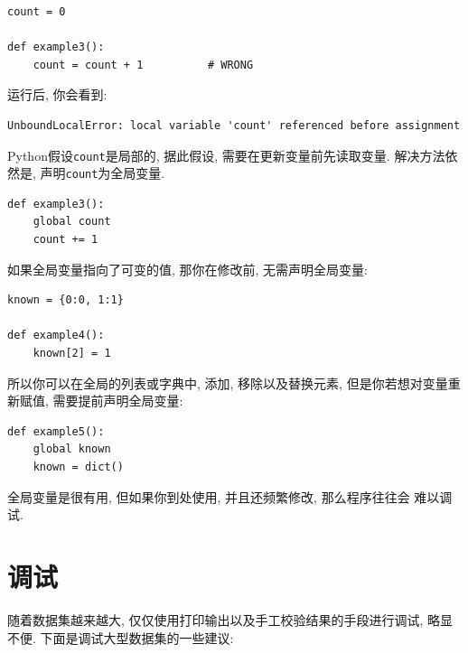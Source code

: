 \documentclass[10pt]{book}
\begin{document}
\begin{verbatim}
count = 0

def example3():
    count = count + 1          # WRONG
\end{verbatim}
%
运行后, 你会看到:

\begin{verbatim}
UnboundLocalError: local variable 'count' referenced before assignment
\end{verbatim}
%
Python假设{\tt count}是局部的, 据此假设, 需要在更新变量前先读取变量. 
解决方法依然是, 声明{\tt count}为全局变量. 

\begin{verbatim}
def example3():
    global count
    count += 1
\end{verbatim}
%
如果全局变量指向了可变的值, 那你在修改前, 无需声明全局变量:

\begin{verbatim}
known = {0:0, 1:1}

def example4():
    known[2] = 1
\end{verbatim}
%
所以你可以在全局的列表或字典中, 添加, 移除以及替换元素, 
但是你若想对变量重新赋值, 需要提前声明全局变量:

\begin{verbatim}
def example5():
    global known
    known = dict()
\end{verbatim}
%
全局变量是很有用, 但如果你到处使用, 并且还频繁修改, 那么程序往往会
难以调试. 


\section{调试}
随着数据集越来越大, 仅仅使用打印输出以及手工校验结果的手段进行调试, 略显不便. 
下面是调试大型数据集的一些建议:
\end{document}

